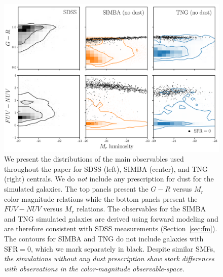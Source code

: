 \begin{figure}
\begin{center}
\includegraphics[width=\textwidth]{figs/observables.pdf} 
    \caption{We present the distributions of the main observables used
    throughout the paper for SDSS (left), SIMBA (center), and TNG (right)
    centrals. We do {\em not} include any prescription for dust for the
    simulated galaxies. The top panels
    present the $G-R$ versus $M_r$ color magnitude relations while the bottom
    panels present the $FUV-NUV$ versus $M_r$ relations. The observables for
    the SIMBA and TNG simulated galaxies are derived using forward modeling and
    are therefore consistent with SDSS measurements (Section~\ref{sec:fm}). The
    contours for SIMBA and TNG do not include galaxies with SFR$=0$, which we
    mark separately in black. Despite similar SMFs,  {\em the simulations
    without any dust prescription show stark differences with observations in
    the color-magnitude observable-space.} 
    }
\label{fig:obs}
\end{center}
\end{figure}
